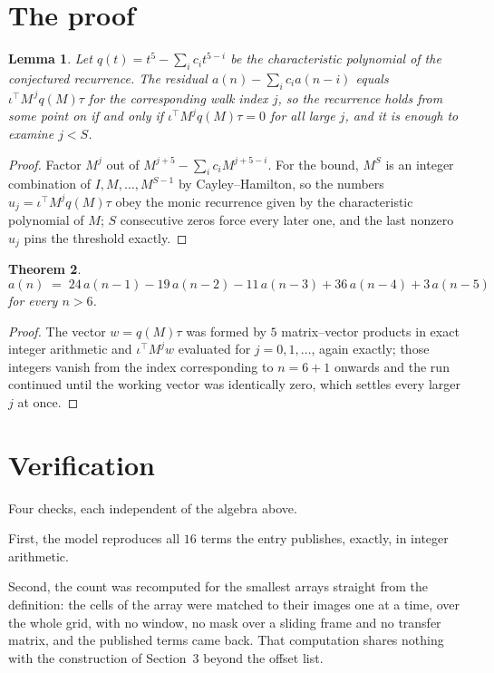 \documentclass[11pt,a4paper]{article}
\theoremstyle{plain}
\newtheorem{theorem}{Theorem}
\newtheorem{lemma}[theorem]{Lemma}
\theoremstyle{definition}
\begin{document}
\section{The proof}

\begin{lemma}\label{lem:crit}
Let $q(t)=t^{5}-\sum_i c_it^{5-i}$ be the characteristic polynomial of the
conjectured recurrence. The residual $a(n)-\sum_ic_ia(n-i)$ equals
$\iota^{\!\top}M^{\,j}q(M)\tau$ for the corresponding walk index $j$, so the recurrence
holds from some point on if and only if $\iota^{\!\top}M^{j}q(M)\tau=0$ for all large $j$,
and it is enough to examine $j<S$.
\end{lemma}

\begin{proof}
Factor $M^{j}$ out of $M^{j+5}-\sum_ic_iM^{j+5-i}$. For the bound, $M^{S}$
is an integer combination of $I,M,\dots,M^{S-1}$ by Cayley--Hamilton, so the numbers
$u_j=\iota^{\!\top}M^{j}q(M)\tau$ obey the monic recurrence given by the characteristic
polynomial of $M$; $S$ consecutive zeros force every later one, and the last nonzero $u_j$
pins the threshold exactly.
\end{proof}

\begin{theorem}
\[
a(n)\;=\;24\,a(n-1) - 19\,a(n-2) - 11\,a(n-3) + 36\,a(n-4) + 3\,a(n-5)
\]
for every $n>6$.
\end{theorem}

\begin{proof}
The vector $w=q(M)\tau$ was formed by $5$ matrix--vector products in exact integer
arithmetic and $\iota^{\!\top}M^{j}w$ evaluated for $j=0,1,\dots$, again exactly; those
integers vanish from the index corresponding to $n=6+1$ onwards and the run continued
until the working vector was identically zero, which settles every larger $j$ at once.
\end{proof}

\section{Verification}

Four checks, each independent of the algebra above.

First, the model reproduces all $16$ terms the entry publishes, exactly, in integer
arithmetic.

Second, the count was recomputed for the smallest arrays straight from the definition: the
cells of the array were matched to their images one at a time, over the whole grid, with no
window, no mask over a sliding frame and no transfer matrix, and the published terms came back.
That computation shares nothing with the construction of Section~3 beyond the offset list.
\end{document}
